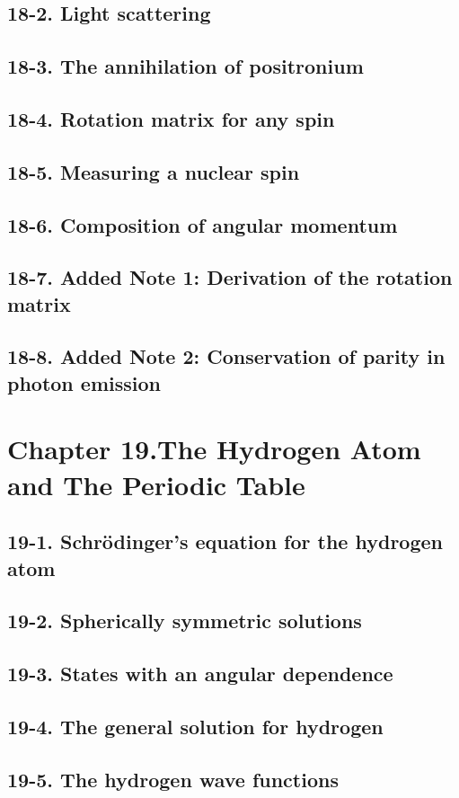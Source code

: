 \documentclass{article}
\begin{document}
\subsection{18-2. Light scattering}
\subsection{18-3. The annihilation of positronium}
\subsection{18-4. Rotation matrix for any spin}
\subsection{18-5. Measuring a nuclear spin}
\subsection{18-6. Composition of angular momentum}
\subsection{18-7. Added Note 1: Derivation of the rotation matrix}
\subsection{18-8. Added Note 2: Conservation of parity in photon emission}
\section{Chapter 19.The Hydrogen Atom and The Periodic Table}
\subsection{19-1. Schrödinger’s equation for the hydrogen atom}
\subsection{19-2. Spherically symmetric solutions}
\subsection{19-3. States with an angular dependence}
\subsection{19-4. The general solution for hydrogen}
\subsection{19-5. The hydrogen wave functions}
\end{document}
